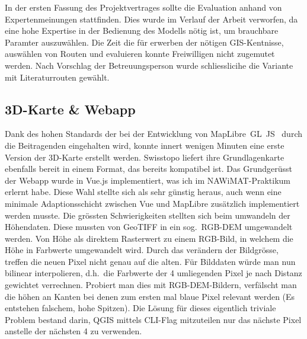 In der ersten Fassung des Projektvertrages sollte die Evaluation anhand von Expertenmeinungen stattfinden. Dies wurde im  Verlauf der Arbeit verworfen, da eine hohe Expertise in der Bedienung des Modells nötig ist, um brauchbare Paramter auszuwählen. Die Zeit die für erwerben der nötigen GIS-Kentnisse, auswählen von Routen und evaluieren konnte Freiwilligen nicht zugemutet werden. Nach Vorschlag der Betreuungsperson wurde schliesslicihe die Variante mit Literaturrouten gewählt.

\subsection{3D-Karte \& Webapp}

Dank des hohen Standards der bei der Entwicklung von MapLibre~GL~JS~\cite{maplibregljs} durch die Beitragenden eingehalten wird, konnte innert wenigen Minuten eine erste Version der 3D-Karte erstellt werden. Swisstopo liefert ihre Grundlagenkarte ebenfalls bereit in einem Format, das bereits kompatibel ist. Das Grundgerüsst der Webapp wurde in Vue.js implementiert, was ich im NAWiMAT-Praktikum erlernt habe. Diese Wahl stellte sich als sehr günstig heraus, auch wenn eine minimale Adaptionsschicht zwischen Vue und MapLibre zusätzlich implementiert werden musste.
Die grössten Schwierigkeiten stellten sich beim umwandeln der Höhendaten. Diese mussten von GeoTIFF in ein sog.\ RGB-DEM umgewandelt werden. Von Höhe als direktem Rasterwert zu einem RGB-Bild, in welchem die Höhe in Farbwerte umgewandelt wird. Durch das verändern der Bildgrösse, treffen die neuen Pixel nicht genau auf die alten. Für Bilddaten würde man nun bilinear interpolieren, d.h.\ die Farbwerte der 4 umliegenden Pixel je nach Distanz gewichtet verrechnen. Probiert man dies mit RGB-DEM-Bildern, verfälscht man die höhen an Kanten bei denen zum ersten mal blaue Pixel relevant werden (Es entstehen falschem, hohe Spitzen). Die Lösung für dieses eigentlich triviale Problem bestand darin, QGIS mittels CLI-Flag mitzuteilen nur das nächste Pixel anstelle der nächsten 4 zu verwenden.

